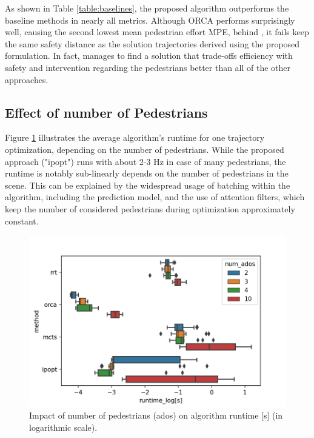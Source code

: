 As shown in Table \ref{table:baselines}, the proposed algorithm outperforms the baseline methods in nearly all metrics. Although \ac{ORCA} performs surprisingly well, causing the second lowest mean pedestrian effort \ac{MPE}, behind \project, it fails keep the same safety distance as the solution trajectories derived using the proposed formulation. In fact, \project manages to find a solution that trade-offs efficiency with safety and intervention regarding the pedestrians better than all of the other approaches.  

\subsection{Effect of number of Pedestrians}
Figure \ref{img:runtime_num_pedestrian} illustrates the average algorithm's runtime for one trajectory optimization, depending on the number of pedestrians. While the proposed approach ("ipopt") runs with about 2-3 Hz in case of many pedestrians, the runtime is notably sub-linearly depends on the number of pedestrians in the scene. This can be explained by the widespread usage of batching within the algorithm, including the prediction model, and the use of attention filters, which keep the number of considered pedestrians during optimization approximately constant.

\begin{figure}[!ht]
\begin{center}
\includegraphics[width=\imgwidth]{images/runtime_peds.png}
\end{center}
\caption{Impact of number of pedestrians (ados) on algorithm runtime [s] (in logarithmic scale).}
\label{img:runtime_num_pedestrian}
\end{figure}

